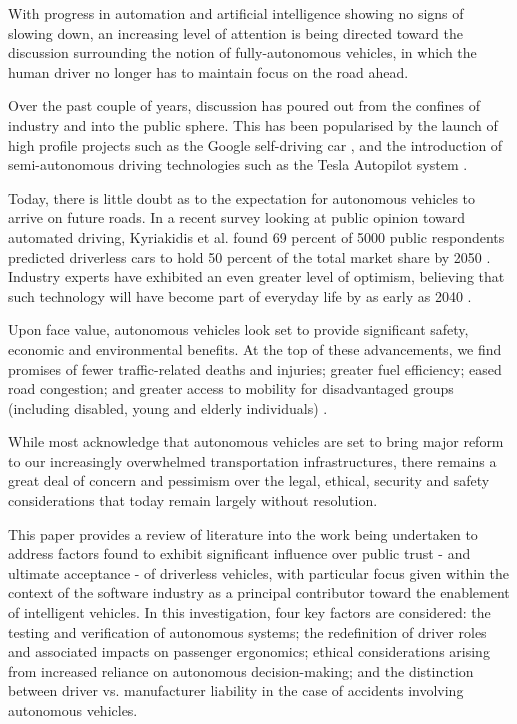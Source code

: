 \documentclass[conference]{IEEEtran}
\begin{document}
With progress in automation and artificial intelligence showing no signs of slowing down, an increasing level of attention is being directed toward the discussion surrounding the notion of fully-autonomous vehicles, in which the human driver no longer has to maintain focus on the road ahead.

 Over the past couple of years, discussion has poured out from the confines of industry and into the public sphere. This has been popularised by the launch of high profile projects such as the Google self-driving car \cite{google-project}, and the introduction of semi-autonomous driving technologies such as the Tesla Autopilot system \cite{tesla-autopilot}.
 
 Today, there is little doubt as to the expectation for autonomous vehicles to arrive on future roads. In a recent survey looking at public opinion toward automated driving, Kyriakidis et al. found 69 percent of 5000 public respondents predicted driverless cars to hold 50 percent of the total market share by 2050 \cite{kyriakidis}. Industry experts have exhibited an even greater level of optimism, believing that such technology will have become part of everyday life by as early as 2040 \cite{action-for-roads}.
 
 Upon face value, autonomous vehicles look set to provide significant safety, economic and environmental benefits. At the top of these advancements, we find promises of fewer traffic-related deaths and injuries; greater fuel efficiency; eased road congestion; and greater access to mobility for disadvantaged groups (including disabled, young and elderly individuals) \cite{action-for-roads}. 
 
While most acknowledge that autonomous vehicles are set to bring major reform to our increasingly overwhelmed transportation infrastructures, there remains a great deal of concern and pessimism over the legal, ethical, security and safety considerations that today remain largely without resolution. 

 This paper provides a review of literature into the work being undertaken to address factors found to exhibit significant influence over public trust - and ultimate acceptance - of driverless vehicles, with particular focus given within the context of the software industry as a principal contributor toward the enablement of intelligent vehicles. In this investigation, four key factors are considered: the testing and verification of autonomous systems; the redefinition of driver roles and associated impacts on passenger ergonomics; ethical considerations arising from increased reliance on autonomous decision-making; and the distinction between driver vs. manufacturer liability in the case of accidents involving autonomous vehicles. 
 
\end{document}
